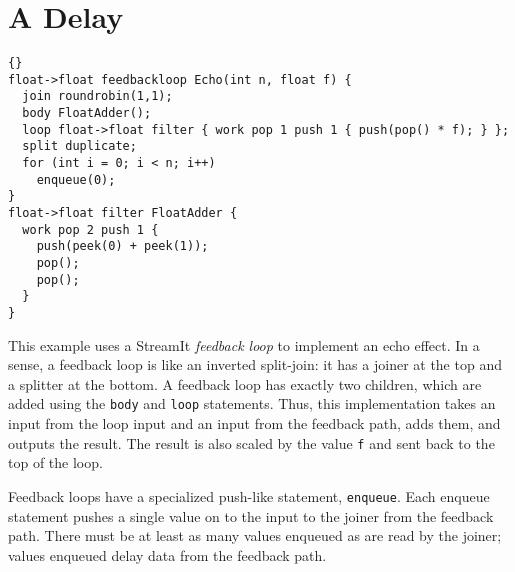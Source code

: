 \section{A Delay}

\begin{lstlisting}{}
float->float feedbackloop Echo(int n, float f) {
  join roundrobin(1,1);
  body FloatAdder();
  loop float->float filter { work pop 1 push 1 { push(pop() * f); } };
  split duplicate;
  for (int i = 0; i < n; i++)
    enqueue(0);
}
float->float filter FloatAdder {
  work pop 2 push 1 {
    push(peek(0) + peek(1));
    pop();
    pop();
  }
}
\end{lstlisting}

This example uses a StreamIt \emph{feedback loop} to implement an echo
effect.  In a sense, a feedback loop is like an inverted split-join:
it has a joiner at the top and a splitter at the bottom.  A feedback
loop has exactly two children, which are added using the \lstinline|body|
and \lstinline|loop| statements.  Thus, this implementation takes an
input from the loop input and an input from the feedback path, adds
them, and outputs the result.  The result is also scaled by the value
\lstinline|f| and sent back to the top of the loop.

Feedback loops have a specialized push-like statement,
\lstinline|enqueue|.  Each enqueue statement pushes a single value on
to the input to the joiner from the feedback path.  There must be at
least as many values enqueued as are read by the joiner; values
enqueued delay data from the feedback path.
